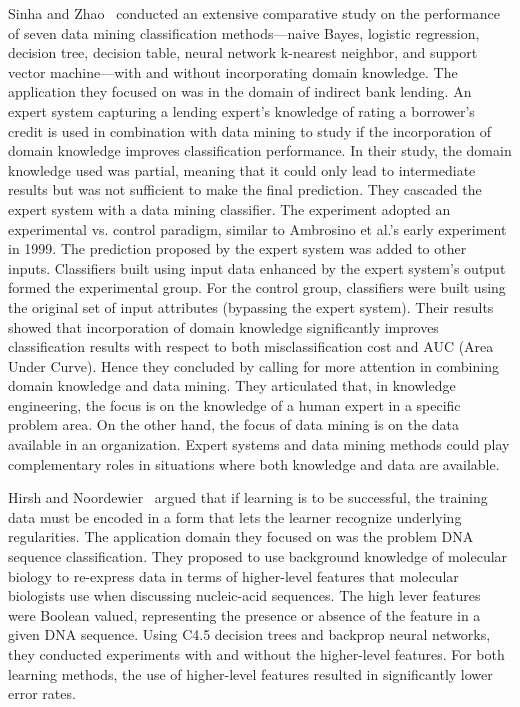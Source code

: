 Sinha and Zhao~\cite{Sinha08} conducted an extensive comparative study on the performance of seven data mining classification methods---naive Bayes, logistic regression, decision tree, decision table, neural network k-nearest neighbor, and support vector machine---with and without incorporating domain knowledge. The application they focused on was in the domain of indirect bank lending. An expert system capturing a lending expert's knowledge of rating a borrower's credit is used in combination with data mining to study if the incorporation of domain knowledge improves classification performance. In their study, the domain knowledge used was partial, meaning that it could only lead to intermediate results but was not sufficient to make the final prediction. They cascaded the expert system with a data mining classifier. The experiment adopted an experimental vs. control paradigm, similar to Ambrosino et al.'s early experiment in 1999. The prediction proposed by the expert system was added to other inputs. Classifiers built using input data enhanced by the expert system's output formed the experimental group. For the control group, classifiers were built using the original set of input attributes (bypassing the expert system). Their results showed that incorporation of domain knowledge significantly improves classification results with respect to both misclassification cost and AUC (Area Under Curve). Hence they concluded by calling for more attention in combining domain knowledge and data mining. They articulated that, in knowledge engineering, the focus is on the knowledge of a human expert in a specific problem area. On the other hand, the focus of data mining is on the data available in an organization. Expert systems and data mining methods could play complementary roles in situations where both knowledge and data are available.

Hirsh and Noordewier~\cite{Hirsh94} argued that if learning is to be successful, the training data must be encoded in a form that lets the learner recognize underlying regularities. The application domain they focused on was the problem DNA sequence classification. They proposed to use background knowledge of molecular biology to re-express data in terms of higher-level features that molecular biologists use when discussing nucleic-acid sequences. The high lever features were Boolean valued, representing the presence or absence of the feature in a given DNA sequence. Using C4.5 decision trees and backprop neural networks, they conducted experiments with and without the higher-level features. For both learning methods, the use of higher-level features resulted in significantly lower error rates.

